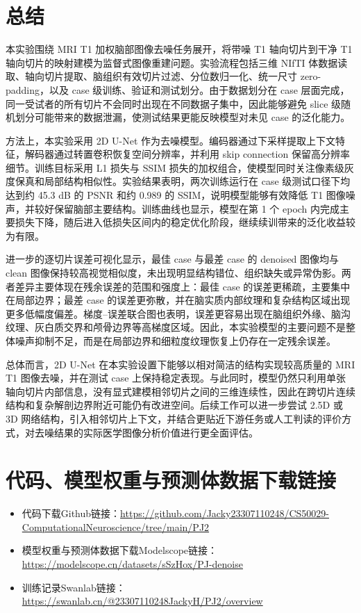 \documentclass[UTF8,a4paper,12pt]{ctexart}
\begin{document}
\section{总结}

本实验围绕 MRI T1 加权脑部图像去噪任务展开，将带噪 T1 轴向切片到干净 T1 轴向切片的映射建模为监督式图像重建问题。实验流程包括三维 NIfTI 体数据读取、轴向切片提取、脑组织有效切片过滤、分位数归一化、统一尺寸 zero-padding，以及 case 级训练、验证和测试划分。由于数据划分在 case 层面完成，同一受试者的所有切片不会同时出现在不同数据子集中，因此能够避免 slice 级随机划分可能带来的数据泄漏，使测试结果更能反映模型对未见 case 的泛化能力。

方法上，本实验采用 2D U-Net 作为去噪模型。编码器通过下采样提取上下文特征，解码器通过转置卷积恢复空间分辨率，并利用 skip connection 保留高分辨率细节。训练目标采用 L1 损失与 SSIM 损失的加权组合，使模型同时关注像素级灰度保真和局部结构相似性。实验结果表明，两次训练运行在 case 级测试口径下均达到约 45.3 dB 的 PSNR 和约 0.989 的 SSIM，说明模型能够有效降低 T1 图像噪声，并较好保留脑部主要结构。训练曲线也显示，模型在第 1 个 epoch 内完成主要损失下降，随后进入低损失区间内的稳定优化阶段，继续续训带来的泛化收益较为有限。

进一步的逐切片误差可视化显示，最佳 case 与最差 case 的 denoised 图像均与 clean 图像保持较高视觉相似度，未出现明显结构错位、组织缺失或异常伪影。两者差异主要体现在残余误差的范围和强度上：最佳 case 的误差更稀疏，主要集中在局部边界；最差 case 的误差更弥散，并在脑实质内部纹理和复杂结构区域出现更多低幅度偏差。梯度--误差联合图也表明，误差更容易出现在脑组织外缘、脑沟纹理、灰白质交界和颅骨边界等高梯度区域。因此，本实验模型的主要问题不是整体噪声抑制不足，而是在局部边界和细粒度纹理恢复上仍存在一定残余误差。

总体而言，2D U-Net 在本实验设置下能够以相对简洁的结构实现较高质量的 MRI T1 图像去噪，并在测试 case 上保持稳定表现。与此同时，模型仍然只利用单张轴向切片内部信息，没有显式建模相邻切片之间的三维连续性，因此在跨切片连续结构和复杂解剖边界附近可能仍有改进空间。后续工作可以进一步尝试 2.5D 或 3D 网络结构，引入相邻切片上下文，并结合更贴近下游任务或人工判读的评价方式，对去噪结果的实际医学图像分析价值进行更全面评估。

\appendix
\section{代码、模型权重与预测体数据下载链接}

\begin{itemize}
  \item 代码下载Github链接：\url{https://github.com/Jacky23307110248/CS50029-ComputationalNeuroscience/tree/main/PJ2}
  \item 模型权重与预测体数据下载Modelscope链接：\url{https://modelscope.cn/datasets/sSzHox/PJ-denoise}
  \item 训练记录Swanlab链接：\url{https://swanlab.cn/@23307110248JackyH/PJ2/overview}
\end{itemize}
\end{document}
